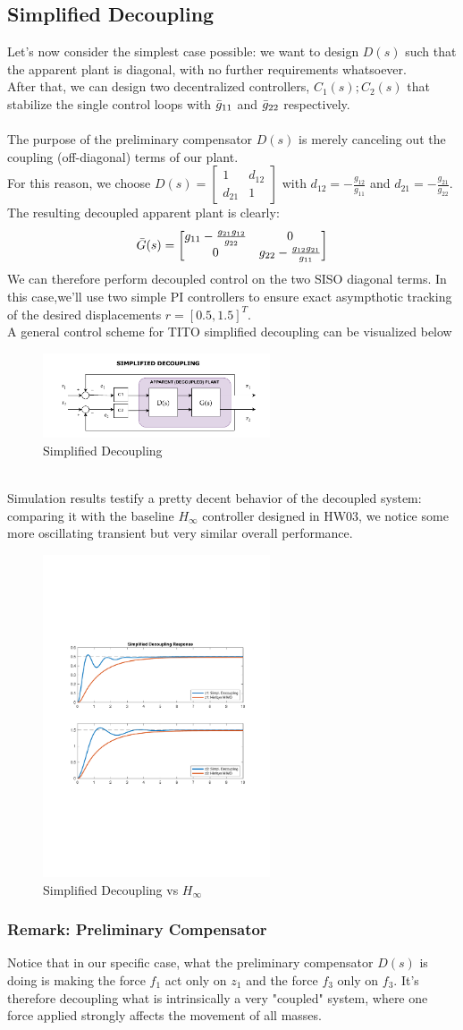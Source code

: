 \documentclass[a4paper, 12pt]{article}
\def\FigureEight{\centering\includegraphics[width=0.6\textwidth]{Figures/fig08.pdf}}
\def\FigureNine{\centering\includegraphics[width=0.6\textwidth]{Figures/fig09.pdf}}
\begin{document}
\subsection{Simplified Decoupling}
Let's now consider the simplest case possible: we want to design $D(s)$ such that the apparent plant is diagonal, with no further requirements whatsoever. 
\\
After that, we can design two decentralized controllers, $C_1(s); C_2(s)$ that stabilize the single control loops with $\Bar{g}_{11}$ and $\Bar{g}_{22}$ respectively.
\\\\
The purpose of the preliminary compensator $D(s)$ is merely canceling out the coupling (off-diagonal) terms of our plant. 
\\
For this reason, we choose 
$D(s) = \begin{bmatrix}
1 & d_{12}\\
d_{21} & 1
\end{bmatrix}$
with $d_{12} = -\frac{g_{12}}{g_{11}}$ and $d_{21} = -\frac{g_{21}}{g_{22}}$.
\\
The resulting decoupled apparent plant is clearly:
\begin{equation}
\Bar{G}(s) = 
\begin{bmatrix}
g_{11}-\frac{g_{21}g_{12}}{g_{22}} & 0\\
0 & g_{22}-\frac{g_{12}g_{21}}{g_{11}}
\end{bmatrix}
\end{equation}
We can therefore perform decoupled control on the two SISO diagonal terms. In this case,we'll use two simple PI controllers to ensure 
exact asympthotic tracking of the desired displacements $r = [0.5, 1.5]^T$.
\\A general control scheme for TITO simplified decoupling can be visualized below
\begin{figure}[h!]
    \FigureEight
    \caption{Simplified Decoupling}
    \label{fig:fig08}
\end{figure}
\\
Simulation results testify a pretty decent behavior of the decoupled system: comparing it with the baseline $H_\infty$ controller designed in HW03, we notice some more oscillating transient but very similar overall performance.
\begin{figure}[h!]
    \FigureNine
    \caption{Simplified Decoupling vs $H_\infty$}
    \label{fig:fig09}
\end{figure}
\subsubsection*{Remark: Preliminary Compensator}
Notice that in our specific case, what the preliminary compensator $D(s)$ is doing is making the force $f_1$ act only on $z_1$ and the force $f_3$ only on $f_3$. It's therefore decoupling what is intrinsically a very "coupled" system, where one force applied strongly affects the movement of all masses.
\end{document}

